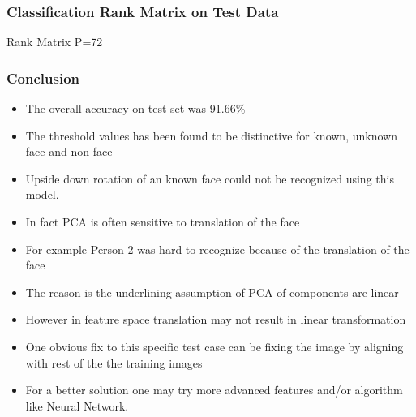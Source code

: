 \documentclass[11pt]{beamer}
\begin{document}
\begin{frame}
\frametitle{Classification Rank Matrix on Test Data}
\begin{table}
  \caption{Rank Matrix P=72}
\end{table}
\end{frame}

\begin{frame}
\frametitle{Conclusion}
\begin{itemize}
  \item The overall accuracy on test set was 91.66\%
  \item The threshold values has been found to be distinctive for known, unknown face and non face
  \item Upside down rotation of an known face could not be recognized using this model.
  \item In fact PCA is often sensitive to translation of the face
  \item For example Person 2 was hard to recognize because of the translation of the face
  \item The reason is the underlining assumption of PCA of components are linear
  \item However in feature space translation may not result in linear transformation
  \item One obvious fix to this specific test case can be fixing the image by aligning with rest of the the training images
  \item For a better solution one may try more advanced features and/or algorithm like Neural Network.
\end{itemize}
\end{frame}


\end{document}
